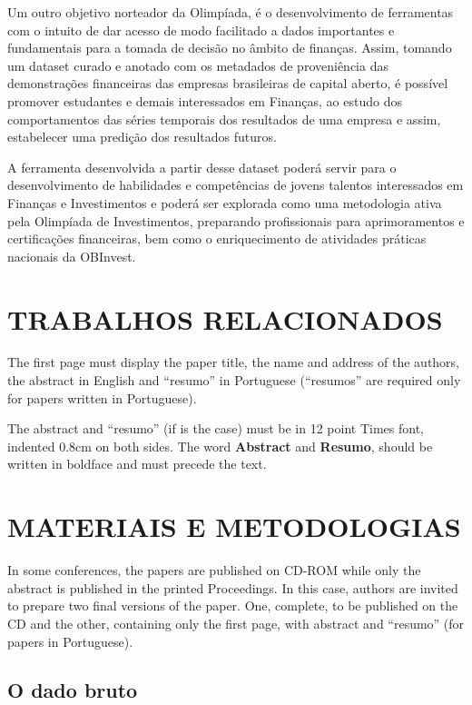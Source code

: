 \documentclass[12pt]{article}
\begin{document}
Um outro objetivo norteador da Olimpíada, é o desenvolvimento de ferramentas com o intuito de dar acesso de modo facilitado a dados importantes e fundamentais para a tomada de decisão no âmbito de finanças. Assim, tomando um dataset curado e anotado com os metadados de proveniência das demonstrações financeiras das empresas brasileiras de capital aberto, é possível promover estudantes e demais interessados em Finanças, ao estudo dos comportamentos das séries temporais dos resultados de uma empresa e assim, estabelecer uma predição dos resultados futuros. 

A ferramenta desenvolvida a partir desse dataset poderá servir para o desenvolvimento de habilidades e competências de jovens talentos interessados em Finanças e Investimentos e poderá ser explorada como uma metodologia ativa pela Olimpíada de Investimentos, preparando profissionais para aprimoramentos e certificações financeiras, bem como o enriquecimento de atividades práticas nacionais da OBInvest.
\section{TRABALHOS RELACIONADOS} \label{sec:trabalhosrelacionados}

The first page must display the paper title, the name and address of the
authors, the abstract in English and ``resumo'' in Portuguese (``resumos'' are required only for papers written in Portuguese).

The abstract and ``resumo'' (if is the case) must be in 12 point Times font,
indented 0.8cm on both sides. The word \textbf{Abstract} and \textbf{Resumo},
should be written in boldface and must precede the text.

\section{MATERIAIS E METODOLOGIAS}

In some conferences, the papers are published on CD-ROM while only the
abstract is published in the printed Proceedings. In this case, authors are
invited to prepare two final versions of the paper. One, complete, to be
published on the CD and the other, containing only the first page, with
abstract and ``resumo'' (for papers in Portuguese).

\subsection{O dado bruto}
\end{document}
